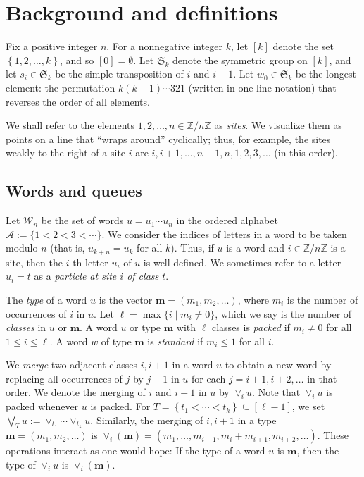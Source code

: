 \documentclass[reqno]{amsart}%
\newcommand{\0}{\phantom{c}}
\newcommand{\defn}[1]{{\color{darkred}\emph{#1}}}
\theoremstyle{plain}
\theoremstyle{definition}
\numberwithin{equation}{section}
\begin{document}


\section{Background and definitions}

\label{sec:background}

Fix a positive integer $n$. For a nonnegative integer $k$, let $\left[  k
\right]  $ denote the set $\left\{  1, 2, \ldots, k \right\}  $, and so $[0] =
\emptyset$. Let $\mathfrak{S}_{k}$ denote the symmetric group on $\left[  k
\right]  $, and let $s_{i} \in\mathfrak{S}_{k}$ be the simple transposition of
$i$ and $i+1$. Let $w_{0} \in\mathfrak{S}_{k}$ be the longest element: the
permutation $k (k-1) \dotsm321$ (written in one line notation) that reverses
the order of all elements.

We shall refer to the elements $1, 2, \ldots, n \in\mathbb{Z} / n \mathbb{Z}$
as \defn{sites}. We visualize them as points on a line that ``wraps around''
cyclically; thus, for example, the sites weakly to the right of a site $i$ are
$i, i+1, \ldots, n-1, n, 1, 2, 3, \ldots$ (in this order).



\subsection{Words and queues}

Let $\mathcal{W}_{n}$ be the set of words $u = u_{1} \dotsm u_{n}$ in the
ordered alphabet $\mathcal{A} := \{1 < 2 < 3 < \cdots\}$. We consider the
indices of letters in a word to be taken modulo $n$ (that is, $u_{k+n} =
u_{k}$ for all $k$). Thus, if $u$ is a word and $i \in\mathbb{Z} / n
\mathbb{Z}$ is a site, then the $i$-th letter $u_{i}$ of $u$ is well-defined.
We sometimes refer to a letter $u_{i} = t$ as a \defn{particle at site $i$ of class $t$}.

The \defn{type} of a word $u$ is the vector $\mathbf{m} = (m_{1}, m_{2},
\ldots)$, where $m_{i}$ is the number of occurrences of $i$ in $u$. Let $\ell=
\max\{i \mid m_{i} \neq0 \}$, which we say is the number of \defn{classes} in
$u$ or $\mathbf{m}$. A word $u$ or type $\mathbf{m}$ with $\ell$ classes is
\defn{packed} if $m_{i} \neq0$ for all $1 \leq i \leq\ell$. A word $w$ of type
$\mathbf{m}$ is \defn{standard} if $m_{i} \leq1$ for all $i$.

We \defn{merge} two adjacent classes $i,i+1$ in a word $u$ to obtain a new
word by replacing all occurrences of $j$ by $j-1$ in $u$ for each $j = i+1,
i+2, \ldots$ in that order. We denote the merging of $i$ and $i+1$ in $u$ by
$\vee_{i} u$. Note that $\vee_{i} u$ is packed whenever $u$ is packed. For $T
= \left\{  t_{1} < \cdots< t_{k} \right\}  \subseteq\left[  \ell-1 \right]  $,
we set $\bigvee_{T} u := \vee_{t_{1}} \cdots\vee_{t_{k}} u$. Similarly, the
merging of $i,i+1$ in a type $\mathbf{m} = (m_{1}, m_{2}, \ldots)$ is
$\vee_{i}(\mathbf{m}) = (m_{1}, \dotsc, m_{i-1}, m_{i} + m_{i+1}, m_{i+2},
\ldots)$. These operations interact as one would hope: If the type of a word
$u$ is $\mathbf{m}$, then the type of $\vee_{i} u$ is $\vee_{i}(\mathbf{m})$.
\end{document}
